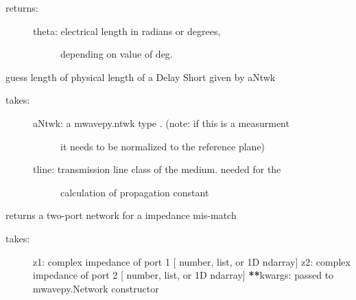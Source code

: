 \documentclass[letterpaper,10pt,english]{sphinxmanual}
\begin{document}
\begin{fulllineitems}
\begin{fulllineitems}
\begin{description}
\item[{returns:}] \leavevmode\begin{description}
\item[{theta: electrical length in radians or degrees, }] \leavevmode
depending on  value of deg.

\end{description}

\end{description}

\end{fulllineitems}


\begin{fulllineitems}
\label{api/mwavepy.media:mwavepy.media.media.Media.guess_length_of_delay_short}
guess length of physical length of a Delay Short given by aNtwk
\begin{description}
\item[{takes:}] \leavevmode\begin{description}
\item[{aNtwk: a mwavepy.ntwk type . (note: if this is a measurment }] \leavevmode
it needs to be normalized to the reference plane)

\item[{tline: transmission line class of the medium. needed for the }] \leavevmode
calculation of propagation constant

\end{description}

\end{description}

\end{fulllineitems}


\begin{fulllineitems}
\label{api/mwavepy.media:mwavepy.media.media.Media.impedance_mismatch}
returns a two-port network for a impedance mis-match
\begin{description}
\item[{takes:}] \leavevmode
z1: complex impedance of port 1 {[} number, list, or 1D ndarray{]}
z2: complex impedance of port 2 {[} number, list, or 1D ndarray{]}
{\color{red}\bfseries{}**}kwargs: passed to mwavepy.Network constructor


\end{description}
\end{fulllineitems}
\end{fulllineitems}
\end{document}
